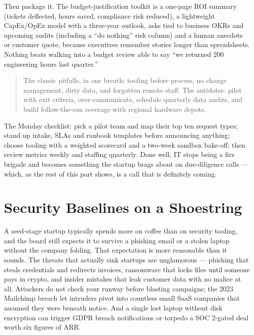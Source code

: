 Then package it. The budget-justification toolkit is a one-page ROI summary (tickets deflected, hours saved, compliance risk reduced), a lightweight CapEx/OpEx model with a three-year outlook, asks tied to business OKRs and upcoming audits (including a ``do nothing'' risk column) and a human anecdote or customer quote, because executives remember stories longer than spreadsheets. Nothing beats walking into a budget review able to say ``we returned 200 engineering hours last quarter.''



\begin{quote}\small
The classic pitfalls, in one breath: tooling before process, no change management, dirty data, and forgotten remote staff. The antidotes: pilot with exit criteria, over-communicate, schedule quarterly data audits, and build follow-the-sun coverage with regional hardware depots.
\end{quote}


The Monday checklist: pick a pilot team and map their top ten request types; stand up intake, SLAs and runbook templates before announcing anything; choose tooling with a weighted scorecard and a two-week sandbox bake-off; then review metrics weekly and staffing quarterly. Done well, IT stops being a fire brigade and becomes something the startup brags about on due-diligence calls — which, as the rest of this part shows, is a call that is definitely coming.

\section{Security Baselines on a Shoestring}
A seed-stage startup typically spends more on coffee than on security tooling, and the board still expects it to survive a phishing email or a stolen laptop without the company folding. That expectation is more reasonable than it sounds. The threats that actually sink startups are unglamorous — phishing that steals credentials and redirects invoices, ransomware that locks files until someone pays in crypto, and insider mistakes that leak customer data with no malice at all. Attackers do not check your runway before blasting campaigns; the 2023 Mailchimp breach let intruders pivot into countless small SaaS companies that assumed they were beneath notice. And a single lost laptop without disk encryption can trigger GDPR breach notifications or torpedo a SOC 2-gated deal worth six figures of ARR.


